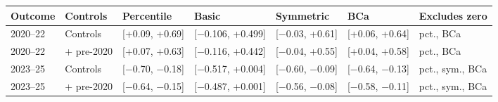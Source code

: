 \footnotesize\setlength{\tabcolsep}{3pt}
\begin{tabular}{lllllll}
\toprule
Outcome & Controls & Percentile & Basic & Symmetric & BCa & Excludes zero \\
\midrule
2020--22 & Controls & [+0.09, +0.69] & [$-$0.106, +0.499] & [$-$0.03, +0.61] & [+0.06, +0.64] & pct., BCa \\
2020--22 & + pre-2020 & [+0.07, +0.63] & [$-$0.116, +0.442] & [$-$0.04, +0.55] & [+0.04, +0.58] & pct., BCa \\
2023--25 & Controls & [$-$0.70, $-$0.18] & [$-$0.517, +0.004] & [$-$0.60, $-$0.09] & [$-$0.64, $-$0.13] & pct., sym., BCa \\
2023--25 & + pre-2020 & [$-$0.64, $-$0.15] & [$-$0.487, +0.001] & [$-$0.56, $-$0.08] & [$-$0.58, $-$0.11] & pct., sym., BCa \\
\bottomrule
\end{tabular}
